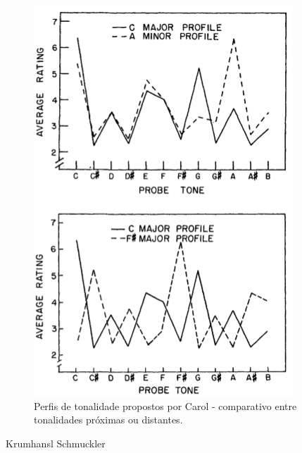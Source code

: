 \documentclass[
	12pt,				%
	openright,			%
	twoside,			%
	a4paper,			%
	english,			%
	french,				%
	spanish,			%
	brazil				%
	]{abntex2}
\begin{document}
\begin{figure}[!h]
	\caption{\label{fig_grafico}Perfis de tonalidade propostos por Carol  - comparativo entre tonalidades próximas ou distantes. }
	\begin{center}
	    \includegraphics[scale=0.6]{CBMS/probeones_krumhansl_p36.png}
	\end{center}
\end{figure}



 
Krumhansl Schmuckler 
\end{document}
